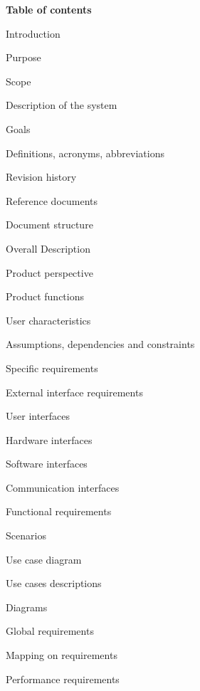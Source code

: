 \documentclass{article}
\begin{document}
\newpage
\textbf{Table of contents}
	\begin{legal}
 	\item Introduction
  		\begin{legal}
    	\item Purpose
		\item Scope
			\begin{legal}
			\item Description of the system
			\item Goals
			\end{legal}
		\item Definitions, acronyms, abbreviations
		\item Revision history
		\item Reference documents
		\item Document structure	
  		\end{legal}
	\item Overall Description
  		\begin{legal}
    	\item Product perspective
		\item Product functions
		\item User characteristics
		\item Assumptions, dependencies and constraints
  		\end{legal}
	\item Specific requirements
  		\begin{legal}
    		\item External interface requirements
			\begin{legal}
			\item User interfaces
			\item Hardware interfaces
			\item Software interfaces
			\item Communication interfaces
	  		\end{legal}
		\item Functional requirements
			\begin{legal}
			\item Scenarios
			\item Use case diagram
			\item Use cases descriptions
			\item Diagrams
			\item Global requirements
			\item Mapping on requirements
			\end{legal}
		\item Performance requirements

\end{legal}
\end{legal}
\end{document}

